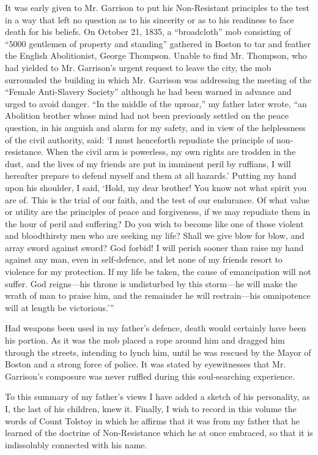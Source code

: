 \documentclass{book}
\begin{document}
It was early given to Mr. Garrison to put his Non-Resistant principles to the test in a way that left no question as to his sincerity or as to his readiness to face death for his beliefs. On October 21, 1835, a “broadcloth” mob consisting of “5000 gentlemen of property and standing” gathered in Boston to tar and feather the English Abolitionist, George Thompson. Unable to find Mr. Thompson, who had yielded to Mr. Garrison’s urgent request to leave the city, the mob surrounded the building in which Mr. Garrison was addressing the meeting of the “Female Anti-Slavery Society” although he had been warned in advance and urged to avoid danger. “In the middle of the uproar,” my father later wrote, “an Abolition brother whose mind had not been previously settled on the peace question, in his anguish and alarm for my safety, and in view of the helplessness of the civil authority, said: ‘I must henceforth repudiate the principle of non-resistance. When the civil arm is powerless, my own rights are trodden in the dust, and the lives of my friends are put in imminent peril by ruffians, I will hereafter prepare to defend myself and them at all hazards.’ Putting my hand upon his shoulder, I said, ‘Hold, my dear brother! You know not what spirit you are of. This is the trial of our faith, and the test of our endurance. Of what value or utility are the principles of peace and forgiveness, if we may repudiate them in the hour of peril and suffering? Do you wish to become like one of those violent and bloodthirsty men who are seeking my life? Shall we give blow for blow, and array sword against sword? God forbid! I will perish sooner than raise my hand against any man, even in self-defence, and let none of my friends resort to violence for my protection. If my life be taken, the cause of emancipation will not suffer. God reigns—his throne is undisturbed by this storm—he will make the wrath of man to praise him, and the remainder he will restrain—his omnipotence will at length be victorious.’”

Had weapons been used in my father’s defence, death would certainly have been his portion. As it was the mob placed a rope around him and dragged him through the streets, intending to lynch him, until he was rescued by the Mayor of Boston and a strong force of police. It was stated by eyewitnesses that Mr. Garrison’s composure was never ruffled during this soul-searching experience.

To this summary of my father’s views I have added a sketch of his personality, as I, the last of his children, knew it. Finally, I wish to record in this volume the words of Count Tolstoy in which he affirms that it was from my father that he learned of the doctrine of Non-Resistance which he at once embraced, so that it is indissolubly connected with his name.
\end{document}
